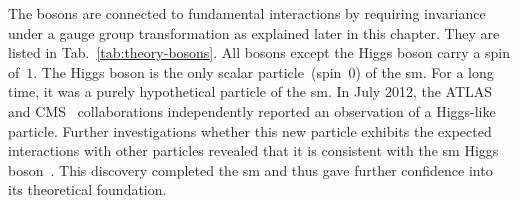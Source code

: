 

The bosons are connected to fundamental interactions by requiring invariance under a gauge group transformation as explained later in this chapter. They are listed in Tab.~\ref{tab:theory-bosons}. All bosons except the Higgs boson carry a spin of~$1$. The Higgs boson is the only scalar particle~(spin~$0$) of the \gls{sm}. For a long time, it was a purely hypothetical particle of the \gls{sm}. In July 2012, the ATLAS~\cite{Aad:2012tfa} and CMS~\cite{Chatrchyan:2012xdj} collaborations independently reported an observation of a Higgs-like particle. Further investigations whether this new particle exhibits the expected interactions with other particles revealed that it is consistent with the \gls{sm} Higgs boson~\cite{Khachatryan:2016vau}. This discovery completed the \gls{sm} and thus gave further confidence into its theoretical foundation.


